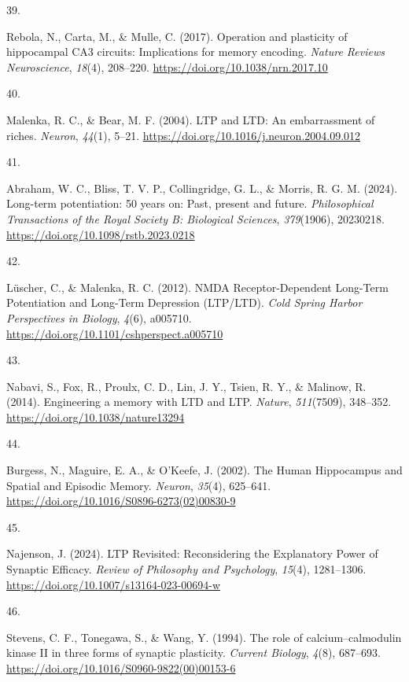 \documentclass[
  11pt,
  letterpaper,
]{scrreprt}
\newlength{\cslhangindent}
\newlength{\csllabelwidth}
\newenvironment{CSLReferences}[2] %
 {\begin{list}{}{%
  \setlength{\itemindent}{0pt}
  \setlength{\leftmargin}{0pt}
  \setlength{\parsep}{0pt}
  \ifodd #1
   \setlength{\leftmargin}{\cslhangindent}
   \setlength{\itemindent}{-1\cslhangindent}
  \fi
  \setlength{\itemsep}{#2\baselineskip}}}
 {\end{list}}
\newcommand{\CSLLeftMargin}[1]{\parbox[t]{\csllabelwidth}{\strut#1\strut}}
\newcommand{\CSLRightInline}[1]{\parbox[t]{\linewidth - \csllabelwidth}{\strut#1\strut}}
\begin{document}
\begin{CSLReferences}{0}{0}
\CSLLeftMargin{39. }%
\CSLRightInline{Rebola, N., Carta, M., \& Mulle, C. (2017). Operation
and plasticity of hippocampal {CA3} circuits: Implications for memory
encoding. \emph{Nature Reviews Neuroscience}, \emph{18}(4), 208--220.
\url{https://doi.org/10.1038/nrn.2017.10}}

\CSLLeftMargin{40. }%
\CSLRightInline{Malenka, R. C., \& Bear, M. F. (2004). {LTP} and {LTD}:
An embarrassment of riches. \emph{Neuron}, \emph{44}(1), 5--21.
\url{https://doi.org/10.1016/j.neuron.2004.09.012}}

\CSLLeftMargin{41. }%
\CSLRightInline{Abraham, W. C., Bliss, T. V. P., Collingridge, G. L., \&
Morris, R. G. M. (2024). Long-term potentiation: 50 years on: Past,
present and future. \emph{Philosophical Transactions of the Royal
Society B: Biological Sciences}, \emph{379}(1906), 20230218.
\url{https://doi.org/10.1098/rstb.2023.0218}}

\CSLLeftMargin{42. }%
\CSLRightInline{Lüscher, C., \& Malenka, R. C. (2012). {NMDA
Receptor-Dependent Long-Term Potentiation} and {Long-Term Depression}
({LTP}/{LTD}). \emph{Cold Spring Harbor Perspectives in Biology},
\emph{4}(6), a005710. \url{https://doi.org/10.1101/cshperspect.a005710}}

\CSLLeftMargin{43. }%
\CSLRightInline{Nabavi, S., Fox, R., Proulx, C. D., Lin, J. Y., Tsien,
R. Y., \& Malinow, R. (2014). Engineering a memory with {LTD} and {LTP}.
\emph{Nature}, \emph{511}(7509), 348--352.
\url{https://doi.org/10.1038/nature13294}}

\CSLLeftMargin{44. }%
\CSLRightInline{Burgess, N., Maguire, E. A., \& O'Keefe, J. (2002). The
{Human Hippocampus} and {Spatial} and {Episodic Memory}. \emph{Neuron},
\emph{35}(4), 625--641.
\url{https://doi.org/10.1016/S0896-6273(02)00830-9}}

\CSLLeftMargin{45. }%
\CSLRightInline{Najenson, J. (2024). {LTP Revisited}: {Reconsidering}
the {Explanatory Power} of {Synaptic Efficacy}. \emph{Review of
Philosophy and Psychology}, \emph{15}(4), 1281--1306.
\url{https://doi.org/10.1007/s13164-023-00694-w}}

\CSLLeftMargin{46. }%
\CSLRightInline{Stevens, C. F., Tonegawa, S., \& Wang, Y. (1994). The
role of calcium--calmodulin kinase {II} in three forms of synaptic
plasticity. \emph{Current Biology}, \emph{4}(8), 687--693.
\url{https://doi.org/10.1016/S0960-9822(00)00153-6}}


\end{CSLReferences}
\end{document}

